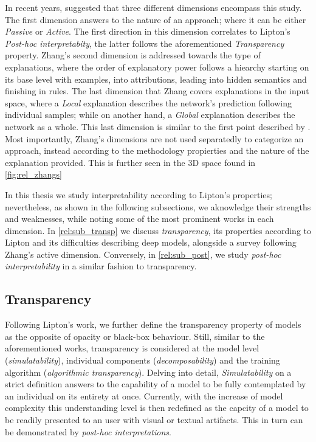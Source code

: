 In recent years, \cite{zhang2021survey} suggested that three different dimensions encompass this 
study. The first dimension answers to the nature of an approach; where it can be either 
\emph{Passive} or \emph{Active}. The first direction in this dimension correlates to Lipton's 
\emph{Post-hoc interpretabity}, the latter follows the aforementioned \emph{Transparency} property.
Zhang's second dimension is addressed towards the type of explanations, where the order of 
explanatory power follows a hiearchy starting on its base level with examples, into attributions, 
leading into hidden semantics and finishing in rules. The last dimension that Zhang covers 
explanations in the input space, where a \emph{Local} explanation describes the network's 
prediction following individual samples; while on another hand, a \emph{Global} explanation 
describes the network as a whole. This last dimension is similar to the first point described by 
\cite{guidotti2018survey}. Most importantly, Zhang's dimensions are not used separatedly to 
categorize an approach, instead according to the methodology propierties and the nature of the 
explanation provided. This is further seen in the 3D space found in \autoref{fig:rel_zhangs}


 
In this thesis we study interpretability according to Lipton's properties; nevertheless, as shown 
in the following subsections, we aknowledge their strengths and weaknesses, while noting some of 
the most prominent works in each dimension. In \autoref{rel:sub_transp} we discuss 
\emph{transparency}, its properties according to Lipton and its difficulties describing deep models, 
alongside a survey following Zhang's active dimension. Conversely, in \autoref{rel:sub_post}, we 
study \emph{post-hoc interpretability} in a similar fashion to transparency.

\subsection{Transparency}
\label{rel:sub_transp}
Following Lipton's work, we further define the transparency property of models as the opposite of 
opacity or black-box behaviour. Still, similar to the aforementioned works, transparency is 
considered at the model level (\emph{simulatability}), individual components 
(\emph{decomposability}) and the training algorithm (\emph{algorithmic transparency}). Delving into 
detail, \emph{Simulatability} on a strict definition answers to the capability of a model to be 
fully contemplated by an individual on its entirety at once. Currently, with the increase of model 
complexity this understanding level is then redefined as the capcity of a model to be readily 
presented to an user with visual or textual artifacts. This in turn can be demonstrated by 
\emph{post-hoc interpretations}.\\

